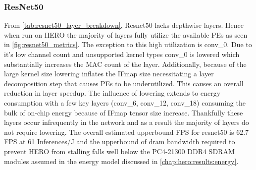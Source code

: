 \subsubsection{ResNet50}

From \autoref{tab:resnet50_layer_breakdown}, Resnet50 lacks depthwise layers.
Hence when run on HERO the majority of layers fully utilize the available PEs as
seen in \autoref{fig:resnet50_metrics}. The exception to
this high utilization is conv\_0. Due to it's low channel count and unsupported
kernel types conv\_0 is lowered which substantially increases the MAC count of
the layer. Additionally, because of the large kernel size lowering inflates the
IFmap size necessitating a layer decomposition step that causes PEs to be
underutilized. This causes an overall reduction in layer speedup. The influence
of lowering extends to energy consumption with a few key layers (conv\_6,
conv\_12, conv\_18) consuming the bulk of on-chip energy because of IFmap tensor
size increase. Thankfully these layers occur infrequently in the network and as
a result the majority of layers do not require lowering. The overall estimated
upperbound FPS for resnet50 is 62.7 FPS at 61 Inferences/J and the upperbound of
dram bandwidth required to prevent HERO from stalling falls well below the
PC4-21300 DDR4 SDRAM modules assumed in the energy model discussed in
\autoref{chap:hero:results:energy}. 



